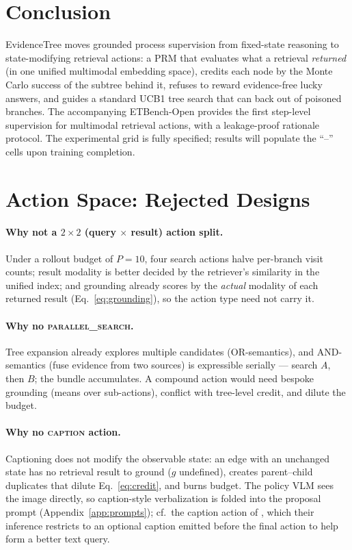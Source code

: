 \documentclass[letterpaper,twocolumn,10pt]{article}
\newcommand{\ours}{EvidenceTree}
\newcommand{\dataset}{ETBench-Open}
\newcommand{\NA}{--}          %
\begin{document}
\section{Conclusion}
\ours{} moves grounded process supervision from fixed-state reasoning to
state-modifying retrieval actions: a PRM that evaluates what a retrieval
\emph{returned} (in one unified multimodal embedding space), credits each
node by the Monte Carlo success of the subtree behind it, refuses to reward
evidence-free lucky answers, and guides a standard UCB1 tree search that
can back out of poisoned branches. The accompanying \dataset{} provides the
first step-level supervision for multimodal retrieval actions, with a
leakage-proof rationale protocol. The experimental grid is fully specified;
results will populate the ``\NA'' cells upon training completion.



\clearpage
\appendix
\onecolumn

\section{Action Space: Rejected Designs}
\label{app:actions}
\paragraph{Why not a $2{\times}2$ (query $\times$ result) action split.}
Under a rollout budget of $P{=}10$, four search actions halve per-branch
visit counts; result modality is better decided by the retriever's
similarity in the unified index; and grounding already scores by the
\emph{actual} modality of each returned result (Eq.~\ref{eq:grounding}),
so the action type need not carry it.
\paragraph{Why no \textsc{parallel\_search}.}
Tree expansion already explores multiple candidates (OR-semantics), and
AND-semantics (fuse evidence from two sources) is expressible serially ---
search $A$, then $B$; the bundle accumulates. A compound action would need
bespoke grounding (means over sub-actions), conflict with tree-level
credit, and dilute the budget.
\paragraph{Why no \textsc{caption} action.}
Captioning does not modify the observable state: an edge with an unchanged
state has no retrieval result to ground ($g$ undefined), creates
parent--child duplicates that dilute Eq.~\eqref{eq:credit}, and burns
budget. The policy VLM sees the image directly, so caption-style
verbalization is folded into the proposal prompt
(Appendix~\ref{app:prompts}); cf.\ the caption action of
\citet{chen2026learningtosearch}, which their inference restricts to an
optional caption emitted before the final action to help form a better
text query.
\end{document}
